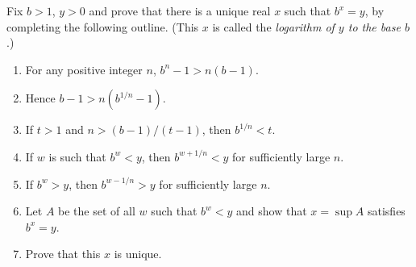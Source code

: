 \documentclass[12 pt, letterpaper]{hmcpset}
\begin{document}
\begin{problem}[7.]
	Fix $b > 1$, $y > 0$ and prove that there is a unique real $x$ such that $b^{x} = y$, by completing the following outline. (This $x$ is called the \textit{logarithm of $y$ to the base $b$}.)
	\begin{enumerate}
		\item For any positive integer $n$, $b^{n} - 1 > n(b - 1)$.
		\item Hence $b - 1 > n(b^{1/n} - 1)$.
		\item If $t > 1$ and $n > (b - 1)/(t - 1)$, then $b^{1/n} < t$.
		\item If $w$ is such that $b^{w} < y$, then $b^{w + 1/n} < y$ for sufficiently large $n$.
		\item If $b^{w} > y$, then $b^{w - 1/n} > y$ for sufficiently large $n$.
		\item Let $A$ be the set of all $w$ such that $b^{w} < y$ and show that $x = \sup A$ satisfies $b^{x} = y$.
		\item Prove that this $x$ is unique.
	\end{enumerate}
\end{problem}
\end{document}
